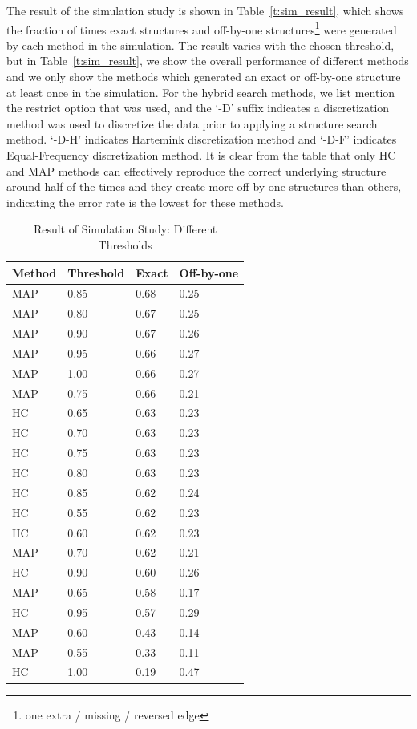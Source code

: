 \documentclass[smallextended]{svjour3}       %
\begin{document}
The result of the simulation study is shown in Table~\ref{t:sim_result}, which shows 
the fraction of times exact structures and off-by-one structures\footnote{one extra 
/ missing / reversed edge} were generated by each method in the simulation. The result varies 
with the chosen threshold, but in Table~\ref{t:sim_result}, we show the overall performance of
different methods and we only show 
the methods which generated an exact or off-by-one structure at least once in the simulation.
For the hybrid search methods, we list mention the restrict option that was used, and the 
`-D' suffix indicates a discretization method was used to discretize the data prior to applying 
a structure search method. `-D-H' indicates Hartemink discretization method and `-D-F' indicates 
Equal-Frequency discretization method. It is clear from the table that only HC and MAP methods
can effectively reproduce the correct underlying structure around half of the times and they create 
more off-by-one structures than others, indicating the error rate is the lowest for these methods.

\begin{table}
\caption{Result of Simulation Study: Different Thresholds}\label{t:sim_threshold}
\begin{tabular}{llll}
\hline
Method & Threshold & Exact & Off-by-one \\ \hline
MAP & 0.85 & 0.68 & 0.25 \\
MAP & 0.80 & 0.67 & 0.25 \\
MAP & 0.90 & 0.67 & 0.26 \\
MAP & 0.95 & 0.66 & 0.27 \\
MAP & 1.00 & 0.66 & 0.27 \\
MAP & 0.75 & 0.66 & 0.21 \\
HC & 0.65 & 0.63 & 0.23 \\
HC & 0.70 & 0.63 & 0.23 \\
HC & 0.75 & 0.63 & 0.23 \\
HC & 0.80 & 0.63 & 0.23 \\
HC & 0.85 & 0.62 & 0.24 \\
HC & 0.55 & 0.62 & 0.23 \\
HC & 0.60 & 0.62 & 0.23 \\
MAP & 0.70 & 0.62 & 0.21 \\
HC & 0.90 & 0.60 & 0.26 \\
MAP & 0.65 & 0.58 & 0.17 \\
HC & 0.95 & 0.57 & 0.29 \\
MAP & 0.60 & 0.43 & 0.14 \\
MAP & 0.55 & 0.33 & 0.11 \\
HC & 1.00 & 0.19 & 0.47\\ \hline
\end{tabular}
\end{table}
\end{document}
